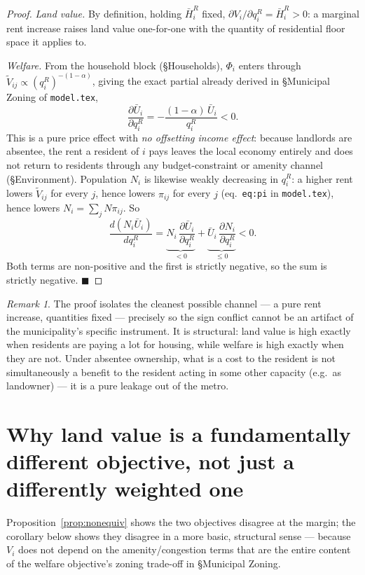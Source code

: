 \documentclass[12pt, a4paper]{article}
\theoremstyle{plain}
\theoremstyle{remark}
\newtheorem*{remark}{Remark}
\begin{document}
\begin{proof}
\emph{Land value.} By definition, holding $\bar H_i^R$ fixed, $\partial V_i/\partial q_i^R=\bar H_i^R>0$: a marginal rent increase raises land value one-for-one with the quantity of residential floor space it applies to.

\emph{Welfare.} From the household block (\S Households), $\Phi_i$ enters through $\tilde V_{ij}\propto (q_i^R)^{-(1-\alpha)}$, giving the exact partial already derived in \S Municipal Zoning of \texttt{model.tex},
\[
\frac{\partial \bar U_i}{\partial q_i^R} = -\frac{(1-\alpha)\,\bar U_i}{q_i^R} < 0.
\]
This is a pure price effect with \emph{no offsetting income effect}: because landlords are absentee, the rent a resident of $i$ pays leaves the local economy entirely and does not return to residents through any budget-constraint or amenity channel (\S Environment). Population $N_i$ is likewise weakly decreasing in $q_i^R$: a higher rent lowers $\tilde V_{ij}$ for every $j$, hence lowers $\pi_{ij}$ for every $j$ (eq.~\texttt{eq:pi} in \texttt{model.tex}), hence lowers $N_i=\sum_jN\pi_{ij}$. So
\[
\frac{d(N_i\bar U_i)}{dq_i^R} = \underbrace{N_i\,\frac{\partial \bar U_i}{\partial q_i^R}}_{<0} + \underbrace{\bar U_i\,\frac{\partial N_i}{\partial q_i^R}}_{\leq 0} < 0.
\]
Both terms are non-positive and the first is strictly negative, so the sum is strictly negative. $\blacksquare$
\end{proof}

\begin{remark}
The proof isolates the cleanest possible channel — a pure rent increase, quantities fixed — precisely so the sign conflict cannot be an artifact of the municipality's specific instrument. It is structural: land value is high exactly when residents are paying a lot for housing, while welfare is high exactly when they are not. Under absentee ownership, what is a cost to the resident is not simultaneously a benefit to the resident acting in some other capacity (e.g.\ as landowner) — it is a pure leakage out of the metro.
\end{remark}

\section*{Why land value is a fundamentally different objective, not just a differently weighted one}

Proposition~\ref{prop:nonequiv} shows the two objectives disagree at the margin; the corollary below shows they disagree in a more basic, structural sense — because $V_i$ does not depend on the amenity/congestion terms that are the entire content of the welfare objective's zoning trade-off in \S Municipal Zoning.
\end{document}
